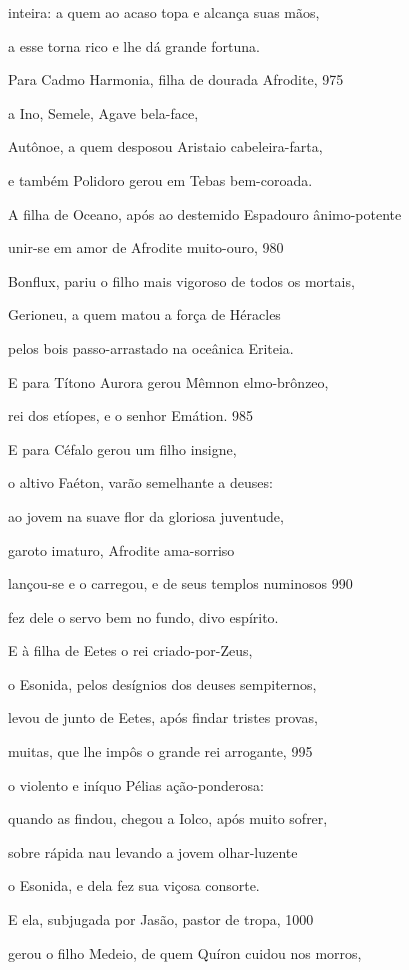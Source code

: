 inteira: a quem ao acaso topa e alcança suas mãos,

a esse torna rico e lhe dá grande fortuna.

\quad{}Para Cadmo Harmonia, filha de dourada Afrodite, \num{975}

a Ino, Semele, Agave bela-face,

Autônoe, a quem desposou Aristaio cabeleira-farta,

e também Polidoro gerou em Tebas bem-coroada.

\quad{}A filha de Oceano, após ao destemido Espadouro ânimo-potente

unir-se em amor de Afrodite muito-ouro, \num{980}

Bonflux, pariu o filho mais vigoroso de todos os mortais,

Gerioneu, a quem matou a força de Héracles

pelos bois passo-arrastado na oceânica Eriteia.

\quad{}E para Títono Aurora gerou Mêmnon elmo-brônzeo,

rei dos etíopes, e o senhor Emátion. \num{985}

E para Céfalo gerou um filho insigne,

o altivo Faéton, varão semelhante a deuses:

ao jovem na suave flor da gloriosa juventude,

garoto imaturo, Afrodite ama-sorriso

lançou-se e o carregou, e de seus templos numinosos \num{990}

fez dele o servo bem no fundo, divo espírito.

\quad{}E à filha de Eetes o rei criado-por-Zeus,

o Esonida, pelos desígnios dos deuses sempiternos,

levou de junto de Eetes, após findar tristes provas,

muitas, que lhe impôs o grande rei arrogante, \num{995}

o violento e iníquo Pélias ação-ponderosa:

quando as findou, chegou a Iolco, após muito sofrer,

sobre rápida nau levando a jovem olhar-luzente

o Esonida, e dela fez sua viçosa consorte.

E ela, subjugada por Jasão, pastor de tropa, \num{1000}

gerou o filho Medeio, de quem Quíron cuidou nos morros,

